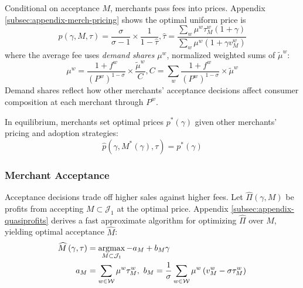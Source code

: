 \documentclass[main.tex]{subfiles}
\begin{document}
Conditional on acceptance $M$, merchants pass fees into prices.
Appendix \ref{subsec:appendix-merch-pricing} shows the optimal uniform price is
\begin{equation}
\hat{p}\left(\gamma,M, \tau\right) =\frac{\sigma}{\sigma-1}\times\frac{1}{1-\hat{\tau}}, \hat{\tau} = \frac{\sum_{w}\mu^{w}\tau_{M}^{w}\left(1+\gamma\right)}{\sum_{w}\mu^{w}\left(1+\gamma v_{M}^{w}\right)} \label{eq:optimal-price}
\end{equation}
where the average fee uses \emph{demand shares} $\mu^w$, normalized weighted sums of $\tilde{\mu}^w$:
\begin{equation}
\mu^{w} = \frac{1+f^{w}}{\left(P^{w}\right)^{1-\sigma}} \times \frac{\tilde{\mu}^w}{C}, C =\sum_{w}\frac{1+f^{w}}{\left(P^{w}\right)^{1-\sigma}} \times \tilde{\mu}^{w}\label{eq:insulated-share-defn}
\end{equation}
Demand shares reflect how other merchants' acceptance decisions affect consumer composition at each merchant through $P^w$.


In equilibrium, merchants set optimal prices $p^*\left(\gamma\right)$ given other merchants' pricing and adoption strategies:
\begin{equation} \hat{p}\left(\gamma,M^{*}\left(\gamma\right),\tau\right)=p^{*}\left(\gamma\right)\label{eq:pricing-eqm} 
\end{equation}

\subsubsection{Merchant Acceptance}
\label{subsubsec:model-merch-accept}
Acceptance decisions trade off higher sales against higher fees.
Let $\widehat{\Pi}\left(\gamma,M\right)$ be profits from accepting $M\subset\mathcal{J}_{1}$ at the optimal price.
Appendix \ref{subsec:appendix-quasiprofits} derives a fast approximate algorithm for optimizing $\widehat{\Pi}$ over $M$, yielding optimal acceptance $\widehat{M}$:
\begin{align}
  \widehat{M}\left(\gamma, \tau\right) & =\argmax_{M\subset\mathcal{J}_{1}}-a_{M}+b_{M}\gamma \label{eq:merch-accept} \\
  a_{M} & =\sum_{w\in\mathcal{W}}\mu^{w}\tau_{M}^{w},\ b_{M}=\frac{1}{\sigma}\sum_{w\in\mathcal{W}}\mu^{w}\left(v_{M}^{w}-\sigma\tau_{M}^{w}\right)
\end{align}
\end{document}
